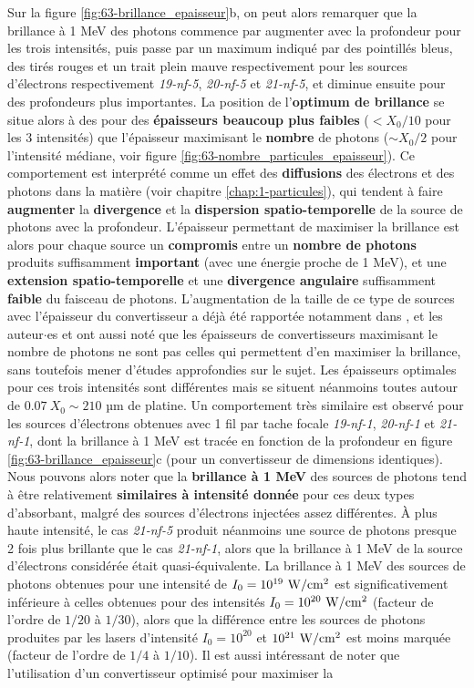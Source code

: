 \begin{refsection}
Sur la figure \ref{fig:63-brillance_epaisseur}b, on peut alors remarquer que la brillance à 1 MeV des photons commence par augmenter avec la profondeur pour les trois intensités, puis passe par un maximum indiqué par des pointillés bleus, des tirés rouges et un trait plein mauve respectivement pour les sources d'électrons respectivement \textit{19-nf-5}, \textit{20-nf-5} et \textit{21-nf-5}, et diminue ensuite pour des profondeurs plus importantes. La position de l'\textbf{optimum de brillance} se situe alors à des pour des \textbf{épaisseurs beaucoup plus faibles} ($<X_0/10$ pour les 3 intensités) que l'épaisseur maximisant le \textbf{nombre} de photons ($\sim X_0/2$ pour l'intensité médiane, voir figure \ref{fig:63-nombre_particules_epaisseur}). Ce comportement est interprété comme un effet des \textbf{diffusions} des électrons et des photons dans la matière (voir chapitre \ref{chap:1-particules}), qui tendent à faire \textbf{augmenter} la \textbf{divergence} et la \textbf{dispersion spatio-temporelle} de la source de photons avec la profondeur. L'épaisseur permettant de maximiser la brillance est alors pour chaque source un \textbf{compromis} entre un \textbf{nombre de photons} produits suffisamment \textbf{important} (avec une énergie proche de 1 MeV), et une \textbf{extension spatio-temporelle} et une \textbf{divergence angulaire} suffisamment \textbf{faible} du faisceau de photons. L'augmentation de la taille de ce type de sources avec l'épaisseur du convertisseur a déjà été rapportée notamment dans \parencite{ben-ismail_2011}, et les auteur$\cdot$es \cite{brantov_2016} et \cite{lobok_2019} ont aussi noté que les épaisseurs de convertisseurs maximisant le nombre de photons ne sont pas celles qui permettent d'en maximiser la brillance, sans toutefois mener d'études approfondies sur le sujet. Les épaisseurs optimales pour ces trois intensités sont différentes mais se situent néanmoins toutes autour de $0.07 ~ X_0 \sim 210$ µm de platine. Un comportement très similaire est observé pour les sources d'électrons obtenues avec 1 fil par tache focale \textit{19-nf-1}, \textit{20-nf-1} et \textit{21-nf-1}, dont la brillance à 1 MeV est tracée en fonction de la profondeur en figure \ref{fig:63-brillance_epaisseur}c (pour un convertisseur de dimensions identiques). Nous pouvons alors noter que la \textbf{brillance à 1 MeV} des sources de photons tend à être relativement \textbf{similaires à intensité donnée} pour ces deux types d'absorbant, malgré des sources d'électrons injectées assez différentes. À plus haute intensité, le cas \textit{21-nf-5} produit néanmoins une source de photons presque 2 fois plus brillante que le cas \textit{21-nf-1}, alors que la brillance à 1 MeV de la source d'électrons considérée était quasi-équivalente. La brillance à 1 MeV des sources de photons obtenues pour une intensité de $I_0 = 10^{19} ~ \rm W/cm^2$ est significativement inférieure à celles obtenues pour des intensités $I_0 = 10^{20} ~ \rm W/cm^2$ (facteur de l'ordre de $1/20$ à $1/30$), alors que la différence entre les sources de photons produites par les lasers d'intensité $I_0 = 10^{20}$ et $10^{21} ~ \rm W/cm^2$ est moins marquée (facteur de l'ordre de $1/4$ à $1/10$). Il est aussi intéressant de noter que l'utilisation d'un convertisseur optimisé pour maximiser la 
\end{refsection}
